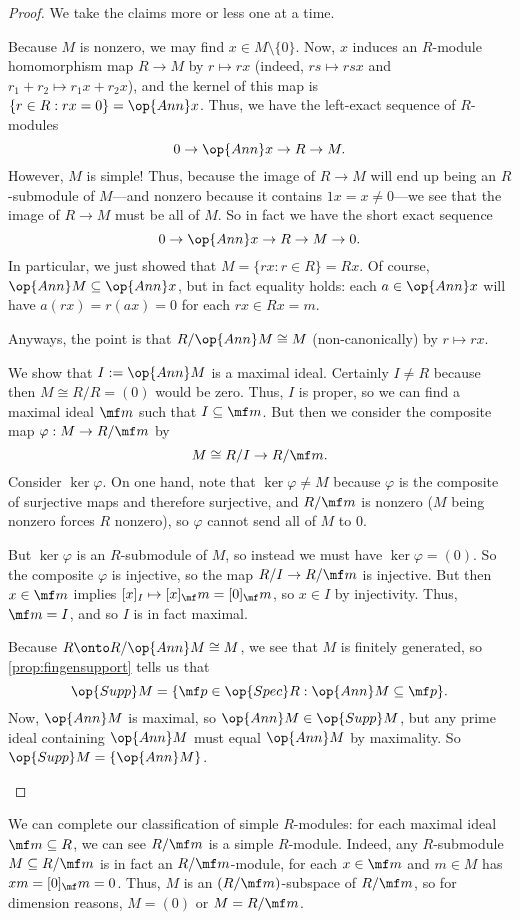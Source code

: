 \begin{proof}
	We take the claims more or less one at a time.
	\begin{listalph}
		\item Because $M$ is nonzero, we may find $x\in M\setminus\{0\}$. Now, $x$ induces an $R$-module homomorphism map $R\to M$ by $r\mapsto rx$ (indeed, $rs\mapsto rsx$ and $r_1+r_2\mapsto r_1x+r_2x$), and the kernel of this map is $\{r\in R:rx=0\}=\op{Ann}x$. Thus, we have the left-exact sequence of $R$-modules
		\[0\to\op{Ann}x\to R\to M.\]
		However, $M$ is simple! Thus, because the image of $R\to M$ will end up being an $R$-submodule of $M$---and nonzero because it contains $1x=x\ne0$---we see that the image of $R\to M$ must be all of $M$. So in fact we have the short exact sequence
		\[0\to\op{Ann}x\to R\to M\to 0.\]
		In particular, we just showed that $M=\{rx:r\in R\}=Rx$. Of course, $\op{Ann}M\subseteq\op{Ann}x$, but in fact equality holds: each $a\in\op{Ann}x$ will have $a(rx)=r(ax)=0$ for each $rx\in Rx=m$.
	
		Anyways, the point is that $R/\op{Ann}M\cong M$ (non-canonically) by $r\mapsto rx$.

		\item We show that $I:=\op{Ann}M$ is a maximal ideal. Certainly $I\ne R$ because then $M\cong R/R=(0)$ would be zero. Thus, $I$ is proper, so we can find a maximal ideal $\mf m$ such that $I\subseteq\mf m$. But then we consider the composite map $\varphi:M\to R/\mf m$ by
		\[M\cong R/I\to R/\mf m.\]
		Consider $\ker\varphi$. On one hand, note that $\ker\varphi\ne M$ because $\varphi$ is the composite of surjective maps and therefore surjective, and $R/\mf m$ is nonzero ($M$ being nonzero forces $R$ nonzero), so $\varphi$ cannot send all of $M$ to $0$.

		But $\ker\varphi$ is an $R$-submodule of $M$, so instead we must have $\ker\varphi=(0)$. So the composite $\varphi$ is injective, so the map $R/I\to R/\mf m$ is injective. But then $x\in\mf m$ implies $[x]_I\mapsto[x]_\mf m=[0]_\mf m$, so $x\in I$ by injectivity. Thus, $\mf m=I$, and so $I$ is in fact maximal.

		\item Because $R\onto R/\op{Ann}M\cong M$, we see that $M$ is finitely generated, so \autoref{prop:fingensupport} tells us that
		\[\op{Supp}M=\{\mf p\in\op{Spec}R:\op{Ann}M\subseteq\mf p\}.\]
		Now, $\op{Ann}M$ is maximal, so $\op{Ann}M\in\op{Supp}M$, but any prime ideal containing $\op{Ann}M$ must equal $\op{Ann}M$ by maximality. So $\op{Supp}M=\{\op{Ann}M\}$.
		\qedhere
	\end{listalph}
\end{proof}
\begin{remark} \label{rem:classifysimple}
	We can complete our classification of simple $R$-modules: for each maximal ideal $\mf m\subseteq R$, we can see $R/\mf m$ is a simple $R$-module. Indeed, any $R$-submodule $M\subseteq R/\mf m$ is in fact an $R/\mf m$-module, for each $x\in\mf m$ and $m\in M$ has $xm=[0]_\mf m=0$. Thus, $M$ is an $(R/\mf m)$-subspace of $R/\mf m$, so for dimension reasons, $M=(0)$ or $M=R/\mf m$.
\end{remark}

